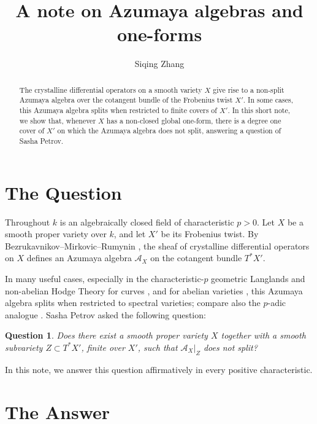\documentclass[11pt]{amsart}
\title{A note on Azumaya algebras and one-forms}
\author{Siqing Zhang}
\date{}
\newtheorem{question}[theorem]{Question}
\begin{document}
\begin{abstract}
The crystalline differential operators on a smooth variety $X$ give rise to a non-split Azumaya algebra over the cotangent bundle of the Frobenius twist $X'$.
In some cases, this Azumaya algebra splits when restricted to finite covers of $X'$.
In this short note, we show that, whenever $X$ has a non-closed global one-form, there is a degree one cover of $X'$ on which the Azumaya algebra does not split, answering a question of Sasha Petrov.
\end{abstract}

\maketitle

\section{The Question}

Throughout \(k\) is an algebraically closed field of characteristic \(p>0\).
Let \(X\) be a smooth proper variety over \(k\), and let \(X'\) be its
Frobenius twist.  By Bezrukavnikov--Mirkovic--Rumynin \cite[Theorem
2.2.3]{BMR}, the sheaf of crystalline differential operators on \(X\) defines
an Azumaya algebra \(\mathcal A_X\) on the cotangent bundle  \(T^*X'\).

In many useful cases, especially in the characteristic-\(p\) geometric
Langlands and non-abelian Hodge Theory for curves
\cite{BB,Groechenig,deCataldoZhang}, and for abelian varieties
\cite{Hao}, this Azumaya algebra splits when
restricted to spectral varieties; compare also the \(p\)-adic analogue
\cite{Heuer}.
Sasha Petrov asked the following question:

\begin{question}\cite[Question 7.3(1)]{Petrov}\label{petrov-question}
Does there exist a smooth proper variety \(X\) together with a smooth
subvariety \(Z\subset T^*X'\), finite over \(X'\), such that
\(\mathcal A_X|_Z\) does not split?
\end{question}

In this note, we answer this question affirmatively in every positive characteristic.

\section{The Answer}
\end{document}
